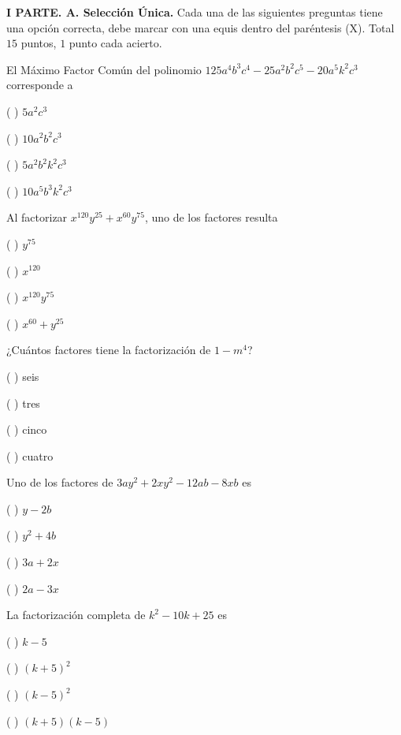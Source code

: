 \documentclass[fleqn]{article}
\begin{document}
\setcounter{page}{2} 

\vspace{-1.5cm}
{\bf I PARTE. A. Selección Única.} Cada una de las siguientes preguntas tiene una opción correcta, debe marcar con una equis dentro del paréntesis (X). Total $15$ puntos, $1$ punto cada acierto.
\vs


\benu
\item El Máximo Factor Común del polinomio $125a^4b^3c^4-25a^2b^2c^5-20a^5k^2c^3$ corresponde a
\vs

\benu
\item[] (  ) $5a^2c^3$
\item[] (  ) $10a^2b^2c^3$
\item[] (  ) $5a^2b^2k^2c^3$
\item[] (  ) $10a^5b^3k^2c^3$
\eenu
\vs

\item Al factorizar $x^{120}y^{25}+x^{60}y^{75}$, uno de los factores resulta
\vs

\benu
\item[] (  ) $y^{75}$
\item[] (  ) $x^{120}$
\item[] (  ) $x^{120}y^{75}$
\item[] (  ) $x^{60}+y^{25}$
\eenu
\vs

\item ¿Cuántos factores tiene la factorización de $1-m^4$?
\vs

\benu
 
\item[] (  ) seis
\item[] (  ) tres
\item[] (  ) cinco
\item[] (  ) cuatro
\eenu
\vs

\item Uno de los factores de $3ay^2+2xy^2-12ab-8xb$ es
\vs

\benu
\item[] (  ) $y-2b$
\item[] (  ) $y^2+4b$
\item[] (  ) $3a+2x$
\item[] (  ) $2a-3x$
\eenu
\vs

\item La factorización completa de $k^2-10k+25$ es
\vs

\benu
\item[] (  ) $k-5$
\item[] (  ) $(k+5)^2$
\item[] (  ) $(k-5)^2$
\item[] (  ) $(k+5)(k-5)$
\eenu
\vs
\end{document}
